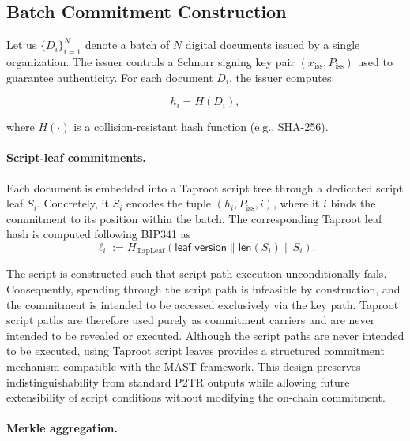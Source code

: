 \documentclass[preprint,12pt]{elsarticle}
\begin{document}
\subsection{Batch Commitment Construction}
\label{sec:createcommit}

Let us $\{D_i\}_{i=1}^{N}$ denote a batch of $N$ digital documents issued by a single organization.  The issuer controls a Schnorr signing key pair $(x_{\mathrm{iss}}, P_{\mathrm{iss}})$ used to guarantee authenticity. For each document $D_i$, the issuer computes:

\begin{equation}
h_i = H(D_i),
\label{eq:doc_hash}
\end{equation}

where $H(\cdot)$ is a collision-resistant hash function (e.g., SHA-256).

\paragraph{Script-leaf commitments.}

Each document is embedded into a Taproot script tree through a dedicated script leaf $S_i$.  Concretely, it $S_i$ encodes the tuple $(h_i, P_{\mathrm{iss}}, i)$, where it $i$ binds the commitment to its position within the batch. The corresponding Taproot leaf hash is computed following BIP341 as
\begin{equation}
\ell_i := H_{\text{TapLeaf}}(\textsf{leaf\_version} \parallel \textsf{len}(S_i) \parallel S_i).
\label{eq:tapleaf}
\end{equation}

The script is constructed such that script-path execution unconditionally fails.  
Consequently, spending through the script path is infeasible by construction, and the commitment is intended to be accessed exclusively via the key path.  Taproot script paths are therefore used purely as commitment carriers and are never intended to be revealed or executed.
Although the script paths are never intended to be executed, using Taproot script leaves provides a structured commitment mechanism compatible with the MAST framework.
This design preserves indistinguishability from standard P2TR outputs while allowing
future extensibility of script conditions without modifying the on-chain commitment.

\paragraph{Merkle aggregation.}
\end{document}
